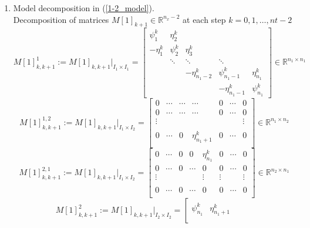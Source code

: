 \documentclass[smallcondensed]{svjour3}
\begin{document}
\begin{enumerate}
\item Model decomposition in (\ref{1-2_model}).
\\
Decomposition of matrices $M[1]_{k+1}\in \mathbb{R}^{n_{x}-2}$ at each step $k=0,1,\ldots,nt-2$ 
{\footnotesize
\begin{equation}
M[1]_{k,k+1}^{1}:=M[1]_{k,k+1}|_{I_{1}\times I_{1}}=\left[\begin{array}{lllllllllllll}
\psi_{1}^{k} & \eta_{2}^{k} & & & \\
-\eta_{1}^{k}& \psi_{2}^{k} &  \eta_{3}^{k} & &  \\
& \ddots & \ddots & \ddots   \\
& &-\eta_{n_{1}-2}^{k} & \psi_{n_{1}-1}^{k}  &\eta_{n_{1}}^{k}  \\
& &  &-\eta_{n_{1}-1 }^{k} &  \psi_{n_{1}}^{k} 
\end{array}\right]\in \mathbb{R}^{n_{1}\times n_{1}}
\end{equation}
\begin{equation}
M[1]_{k,k+1}^{1,2}:=M[1]_{k,k+1}|_{I_{1}\times I_{2}}=\left[\begin{array}{lllllllllllll}
0 &\cdots  &\cdots &\cdots &0 &\cdots &0 \\
0& \cdots &\cdots  &\cdots &0 &\cdots & 0 \\
\vdots & &  & & & &\vdots \\
& &  & & \\
0&\cdots &0& \eta_{n_{1}+1}^{k} &0    & \cdots  &0  \\
\end{array}\right]\in \mathbb{R}^{n_{1}\times n_{2}}
\end{equation}
\begin{equation}
M[1]_{k,k+1}^{2,1}:=M[1]_{k,k+1}|_{I_{1}\times I_{2}}=\left[\begin{array}{lllllllllllll}
0 & \cdots&0 &0 &\eta_{n_{1}}^{k} &0 &\cdots &0 \\
0& \cdots &  0 &\cdots &0 &0 &\cdots &0 \\
\vdots& & & & \vdots &\vdots & & \vdots \\
& &  & & \\
0& \cdots &  0 &\cdots &0&0 &\cdots &0 \\
\end{array}\right]\in \mathbb{R}^{n_{2}\times n_{1}}
\end{equation}
\begin{equation}
M[1]_{k,k+1}^{2}:=M[1]_{k,k+1}|_{I_{2}\times I_{2}}=\left[\begin{array}{lllllllllllll}
\psi_{n_{1}}^{k} & \eta_{n_{1}+1}^{k} & & & \\

\end{array}
\end{equation}}
\end{enumerate}
\end{document}

